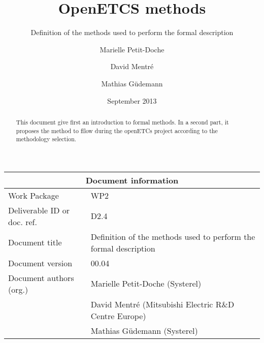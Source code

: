 \documentclass{template/openetcs_article}
\begin{document}
\frontmatter
{}






\title{OpenETCS methods}

\subtitle{ Definition of the methods used to perform the formal description}

\date{September 2013}


\author{Marielle Petit-Doche}


\author{David Mentré}

\author{Mathias Güdemann}


 


\begin{abstract}
This document give first an introduction to formal  methods.
In a second part, it proposes the method to  fllow during the openETCs project according to the methodology selection.

\end{abstract}

\maketitle
\tableofcontents
\listoffiguresandtables
\newpage

\begin{tabular}{|p{4.4cm}|p{8.7cm}|}
\hline
\multicolumn{2}{|c|}{Document information} \\
\hline
Work Package &  WP2  \\
Deliverable ID or doc. ref. & D2.4\\
\hline
Document title & Definition of the methods used to perform the formal description \\
Document version & 00.04 \\
Document authors (org.)  & Marielle Petit-Doche (Systerel)  \\
  & David Mentré (Mitsubishi Electric R\&D Centre Europe)  \\
  & Mathias Güdemann (Systerel)  \\
\hline
\end{tabular}
\end{document}
